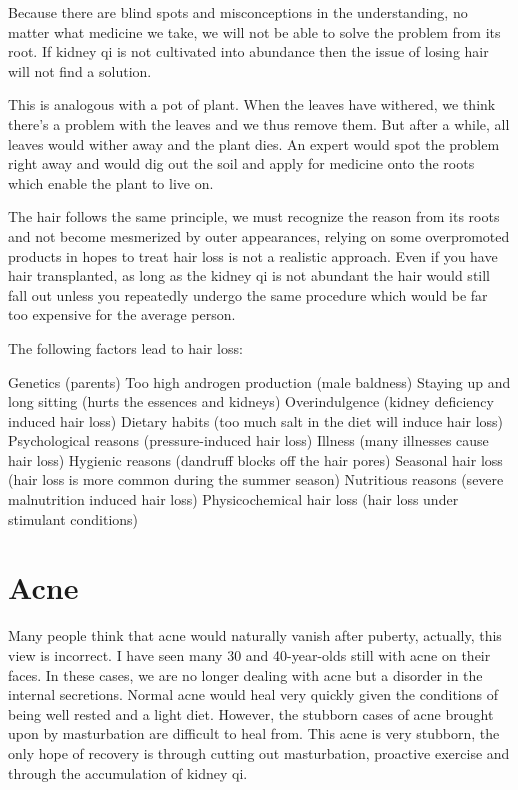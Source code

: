 \documentclass[
]{book}
\begin{document}
Because there are blind spots and misconceptions in the understanding, no matter what medicine we take, we will not be able to solve the problem from its root. If kidney qi is not cultivated into abundance then the issue of losing hair will not find a solution.

This is analogous with a pot of plant. When the leaves have withered, we think there's a problem with the leaves and we thus remove them. But after a while, all leaves would wither away and the plant dies. An expert would spot the problem right away and would dig out the soil and apply for medicine onto the roots which enable the plant to live on.

The hair follows the same principle, we must recognize the reason from its roots and not become mesmerized by outer appearances, relying on some overpromoted products in hopes to treat hair loss is not a realistic approach. Even if you have hair transplanted, as long as the kidney qi is not abundant the hair would still fall out unless you repeatedly undergo the same procedure which would be far too expensive for the average person.

The following factors lead to hair loss:

Genetics (parents)
Too high androgen production (male baldness)
Staying up and long sitting (hurts the essences and kidneys)
Overindulgence (kidney deficiency induced hair loss)
Dietary habits (too much salt in the diet will induce hair loss)
Psychological reasons (pressure-induced hair loss)
Illness (many illnesses cause hair loss)
Hygienic reasons (dandruff blocks off the hair pores)
Seasonal hair loss (hair loss is more common during the summer season)
Nutritious reasons (severe malnutrition induced hair loss)
Physicochemical hair loss (hair loss under stimulant conditions)

\hypertarget{acne}{%
\section{Acne}\label{acne}}

Many people think that acne would naturally vanish after puberty, actually, this view is incorrect. I have seen many 30 and 40-year-olds still with acne on their faces. In these cases, we are no longer dealing with acne but a disorder in the internal secretions. Normal acne would heal very quickly given the conditions of being well rested and a light diet. However, the stubborn cases of acne brought upon by masturbation are difficult to heal from. This acne is very stubborn, the only hope of recovery is through cutting out masturbation, proactive exercise and through the accumulation of kidney qi.
\end{document}
